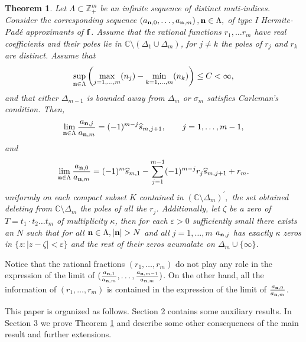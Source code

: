 \documentclass[10pt,a4paper]{article}
\newtheorem{theorem}{Theorem}[section]
\theoremstyle{definition}
\theoremstyle{remark}
\numberwithin{equation}{section}
\begin{document}
\begin{theorem} \label{th1}  Let  $\Lambda \subset \mathbb{Z}_+^{m}$ be an infinite sequence of distinct muti-indices. Consider the corresponding sequence $\left(a_{{\bf n},0},\ldots, a_{{\bf n},m}\right), {\bf n} \in \Lambda,$ of  type I  Hermite-Pad\'e approximants of ${\bf f}$.
Assume  that the rational functions $r_{1},\ldots r_{m}$  have real coefficients and their  poles  lie in $\mathbb{C}\setminus (\Delta_{1}\cup \Delta_{m})$, for $j\neq k$ the poles of $r_j$ and $r_k$ are distinct.
Assume that
\begin{equation}\label{cond1} \sup_{{\bf n}\in \Lambda}\left(\max_{j=1,\ldots,m}(n_j) - \min_{k=1,\ldots,m}(n_k) \right)\leq C < \infty, \end{equation}
and that either $\Delta_{m-1}$ is bounded away from $\Delta_m$  or $\sigma_m$ satisfies Carleman's condition.
Then,
\begin{equation} \label{fund1} \lim_{{\bf n} \in \Lambda}  \frac{a_{{\bf n}, j}}{a_{{\bf n},m}} =  (-1)^{m-j}\widehat{s}_{m,j+1}, \qquad j=1,\ldots,m-1,
\end{equation}
and
\begin{equation} \label{fund0} \lim_{{\bf n} \in \Lambda}  \frac{a_{{\bf n}, 0}}{a_{{\bf n},m}} = (-1)^{m}\widehat{s}_{m,1}-\sum_{j=1}^{m-1}(-1)^{m-j}r_j\widehat{s}_{m,j+1}+r_m.
\end{equation}
uniformly on each compact subset $K$ contained in $(\mathbb{C}\setminus \Delta_{m})^{\prime},$ the set obtained deleting from $\mathbb{C}\setminus \Delta_{m} $ the poles of all the $r_j$.
 Additionally, let $\zeta$ be a zero of $T=t_1\cdot t_2\ldots t_m$ of multiplicity $\kappa$,  then
   for each $\varepsilon >0$ sufficiently small there exists an $N$ such that for all ${\bf n} \in \Lambda, |{\bf n}| > N$ and all $j=1,\ldots,m$  $a_{{\bf n},j}$ has exactly   $\kappa$ zeros in $\{z:|z-\zeta| < \varepsilon\}$ and the rest of their zeros acumalate on $\Delta_m\cup \{\infty\}$.
\end{theorem}

Notice that the rational fractions $(r_1,\ldots,r_m)$ do not play any role in the expression of the limit  of $(\frac{a_{{\bf n}, 1}}{a_{{\bf n},m}},\ldots,\frac{a_{{\bf n}, m-1}}{a_{{\bf n},m}})$. On the other hand, all the information of $(r_1,\ldots,r_m)$ is contained in the expression of the limit of $\frac{a_{{\bf n}, 0}}{a_{{\bf n},m}}$.\par

This paper is organized as follows. Section 2 contains some auxiliary results. In Section 3 we prove Theorem \ref{th1} and describe some other consequences of the main result and further extensions.
\end{document}
